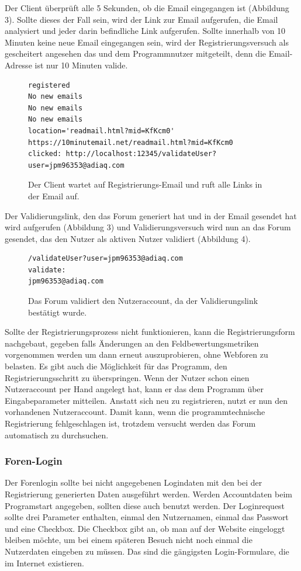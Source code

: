 Der Client überprüft alle 5 Sekunden, ob die Email eingegangen ist (Abbildung 3). Sollte dieses der Fall sein, wird der Link zur Email aufgerufen, die Email analysiert und jeder darin befindliche Link aufgerufen. Sollte innerhalb von 10 Minuten keine neue Email eingegangen sein, wird der Registrierungsversuch als gescheitert angesehen das und dem Programmnutzer mitgeteilt, denn die Email-Adresse ist nur 10 Minuten valide.

\begin{figure}[ht]
\begin{lstlisting}[language=HTML5]
registered
No new emails
No new emails
No new emails
location='readmail.html?mid=KfKcm0'
https://10minutemail.net/readmail.html?mid=KfKcm0
clicked: http://localhost:12345/validateUser?user=jpm96353@adiaq.com
\end{lstlisting}
\caption{Der Client wartet auf Registrierungs-Email und ruft alle Links in der Email auf.}
\end{figure}

Der Validierungslink, den das Forum generiert hat und in der Email gesendet hat wird aufgerufen (Abbildung 3) und Validierungsversuch wird nun an das Forum gesendet, das den Nutzer als aktiven Nutzer validiert (Abbildung 4).

\begin{figure}[ht]
\begin{lstlisting}[language=HTML5]
/validateUser?user=jpm96353@adiaq.com
validate:
jpm96353@adiaq.com
\end{lstlisting}
\caption{Das Forum validiert den Nutzeraccount, da der Validierungslink bestätigt wurde.}
\end{figure}

Sollte der Registrierungsprozess nicht funktionieren, kann die Registrierungsform nachgebaut, gegeben falls Änderungen an den Feldbewertungsmetriken vorgenommen werden um dann erneut auszuprobieren, ohne Webforen zu belasten. Es gibt auch die Möglichkeit für das Programm, den Registrierungsschritt zu überspringen. Wenn der Nutzer schon einen Nutzeraccount per Hand angelegt hat, kann er das dem Programm über Eingabeparameter mitteilen. Anstatt sich neu zu registrieren, nutzt er nun den vorhandenen Nutzeraccount. Damit kann, wenn die programmtechnische Registrierung fehlgeschlagen ist, trotzdem versucht werden das Forum automatisch zu durchsuchen.

\subsubsection{Foren-Login}
Der Forenlogin sollte bei nicht angegebenen Logindaten mit den bei der Registrierung generierten Daten ausgeführt werden. Werden Accountdaten beim Programstart angegeben, sollten diese auch benutzt werden. Der Loginrequest sollte drei Parameter enthalten, einmal den Nutzernamen, einmal das Passwort und eine Checkbox. Die Checkbox gibt an, ob man auf der Website eingeloggt bleiben möchte, um bei einem späteren Besuch nicht noch einmal die Nutzerdaten eingeben zu müssen. Das sind die gängigsten Login-Formulare, die im Internet existieren.

